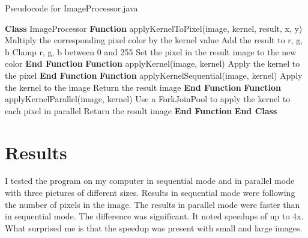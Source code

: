 \documentclass{article}
\begin{document}
\begin{multicols}{2}
    \begin{algorithm}[H]
        \caption{Pseudocode for ImageProcessor.java}
        \begin{algorithmic}[1]
            \State \textbf{Class} ImageProcessor
            \State \textbf{Function} applyKernelToPixel(image, kernel, result, x, y)
            \State Multiply the corresponding pixel color by the kernel value
            \State Add the result to r, g, b
            \EndFor
            \State Clamp r, g, b between 0 and 255
            \State Set the pixel in the result image to the new color
            \State \textbf{End Function}
            \State
            \State \textbf{Function} applyKernel(image, kernel)
            \State Apply the kernel to the pixel
            \EndFor
            \State \textbf{End Function}
            \State
            \State \textbf{Function} applyKernelSequential(image, kernel)
            \State Apply the kernel to the image
            \State Return the result image
            \State \textbf{End Function}
            \State
            \State \textbf{Function} applyKernelParallel(image, kernel)
            \State Use a ForkJoinPool to apply the kernel to each pixel in parallel
            \State Return the result image
            \State \textbf{End Function}
            \State \textbf{End Class}
        \end{algorithmic}
    \end{algorithm}

    \newpage

    \section{Results}

    I tested the program on my computer in sequential mode and in parallel mode with three pictures of different sizes. Results in sequential mode were following the number of pixels in the image. The results in parallel mode were faster than in sequential mode. The difference was significant. It noted speedups of up to 4x. What surprised me is that the speedup was present with small and large images.


\end{multicols}
\end{document}
